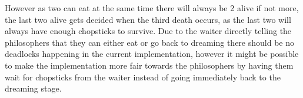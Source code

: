 \documentclass[a4paper,11pt]{article}
\begin{document}
However as two can eat at the same time there will always be 2 alive if not more, the last two alive gets decided when the third death occurs, as the last two will always have enough chopsticks to survive. Due to the waiter directly telling the philosophers that they can either eat or go back to dreaming there should be no deadlocks happening in the current implementation, however it might be possible to make the implementation more fair towards the philosophers by having them wait for chopsticks from the waiter instead of going immediately back to the dreaming stage.
\end{document}
